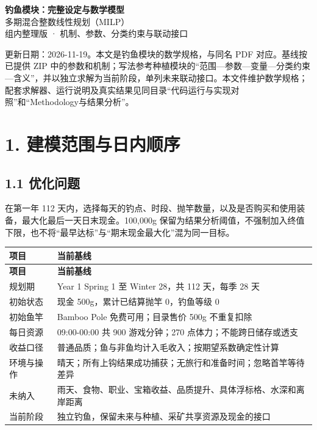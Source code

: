 \documentclass[11pt,a4paper]{article}
\begin{document}
\begin{center}
{\LARGE\bfseries 钓鱼模块：完整设定与数学模型}\\[6pt]
{\large 多期混合整数线性规划（MILP）}\\[4pt]
{\small 组内整理版 · 机制、参数、分类约束与联动接口}
\end{center}


更新日期：2026-11-19。本文是钓鱼模块的数学规格，与同名 PDF 对应。基线按已提供 ZIP 中的参数和机制；写法参考种植模块的“范围—参数—变量—分类约束—含义”，并以独立求解为当前阶段，单列未来联动接口。本文件维护数学规格；配套求解器、运行说明及真实结果见同目录“代码运行与实现对照”和“Methodology与结果分析”。\par

\section*{\color{modelblue}1. 建模范围与日内顺序}

\subsection*{1.1 优化问题}

在第一年 112 天内，选择每天的钓点、时段、抛竿数量，以及是否购买和使用装备，最大化最后一天日末现金。100,000g 保留为结果分析阈值，不强制加入终值下限，也不将“最早达标”与“期末现金最大化”混为同一目标。\par

{\small\begin{longtable}{L{0.23\dimexpr\textwidth-20pt\relax}L{0.77\dimexpr\textwidth-20pt\relax}}\toprule
\textbf{项目} & \textbf{当前基线}\\\midrule\endfirsthead
\textbf{项目} & \textbf{当前基线}\\\midrule\endhead
\bottomrule\endfoot
规划期 & Year 1 Spring 1 至 Winter 28，共 112 天，每季 28 天\\
初始状态 & 现金 500g，累计已结算抛竿 0，钓鱼等级 0\\
初始鱼竿 & Bamboo Pole 免费可用；目录售价 500g 不重复扣除\\
每日资源 & 09:00-00:00 共 900 游戏分钟；270 点体力；不能跨日储存或透支\\
收益口径 & 普通品质；鱼与非鱼均计入毛收入；按期望系数确定性计算\\
环境与操作 & 晴天；所有上钩结果成功捕获；无旅行和准备时间；忽略首竿等待差异\\
未纳入 & 雨天、食物、职业、宝箱收益、品质提升、具体浮标格、水深和离岸距离\\
当前阶段 & 独立钓鱼，保留未来与种植、采矿共享资源及现金的接口\\
\end{longtable}}
\end{document}

